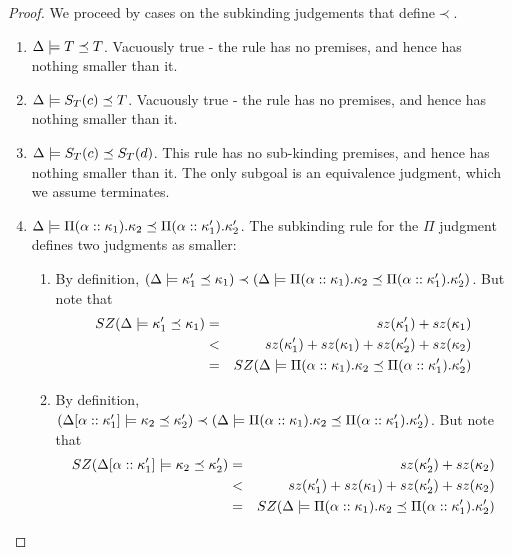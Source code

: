 \documentclass[12pt,twoside,fleqn]{amsart}
\theoremstyle{plain}
\theoremstyle{plain}
\theoremstyle{definition}
\begin{document}
\begin{proof}
We proceed by cases on the subkinding judgements that define\( \prec  \).
\begin{enumerate}
\item \( \Delta  \models T \preceq T \). Vacuously true - the rule has no premises,
and hence has nothing smaller than it. 
\item \( \Delta  \models S_{T}(c ) \preceq T \). Vacuously true - the rule has no premises,
and hence has nothing smaller than it. 
\item \( \Delta  \models S_{T}(c ) \preceq S_{T}(d ) \). This rule has no sub-kinding premises,
and hence has nothing smaller than it. The only subgoal is an equivalence judgment,
which we assume terminates. 
\item \( \Delta  \models \Pi (\alpha ::\kappa _{1}).\kappa _{2} \preceq \Pi (\alpha ::\kappa _{1}').\kappa _{2}' \).
The subkinding rule for the \( \Pi  \) judgment defines two judgments as smaller:

\begin{enumerate}
\item By definition, \( (\Delta  \models \kappa _{1}' \preceq \kappa _{1})\prec (\Delta  \models \Pi (\alpha ::\kappa _{1}).\kappa _{2} \preceq \Pi (\alpha ::\kappa _{1}').\kappa _{2}') \).
But note that 
\begin{eqnarray*}
SZ(\Delta  \models \kappa _{1}' \preceq \kappa _{1}) & = & sz(\kappa _{1}')+sz(\kappa _{1})\\
 & < & sz(\kappa _{1}')+sz(\kappa _{1})+sz(\kappa _{2}')+sz(\kappa _{2})\\
 & = & SZ(\Delta  \models \Pi (\alpha ::\kappa _{1}).\kappa _{2} \preceq \Pi (\alpha ::\kappa _{1}').\kappa _{2}')
\end{eqnarray*}

\item By definition, \( (\Delta  [\alpha   ::\kappa _{1}'  ] \models \kappa _{2} \preceq \kappa _{2}')\prec (\Delta  \models \Pi (\alpha ::\kappa _{1}).\kappa _{2} \preceq \Pi (\alpha ::\kappa _{1}').\kappa _{2}') \).
But note that 
\begin{eqnarray*}
SZ(\Delta  [\alpha   ::\kappa _{1}'  ] \models \kappa _{2} \preceq \kappa _{2}') & = & sz(\kappa _{2}')+sz(\kappa _{2})\\
 & < & sz(\kappa _{1}')+sz(\kappa _{1})+sz(\kappa _{2}')+sz(\kappa _{2})\\
 & = & SZ(\Delta  \models \Pi (\alpha ::\kappa _{1}).\kappa _{2} \preceq \Pi (\alpha ::\kappa _{1}').\kappa _{2}')
\end{eqnarray*}


\end{enumerate}
\end{enumerate}
\end{proof}
\end{document}

